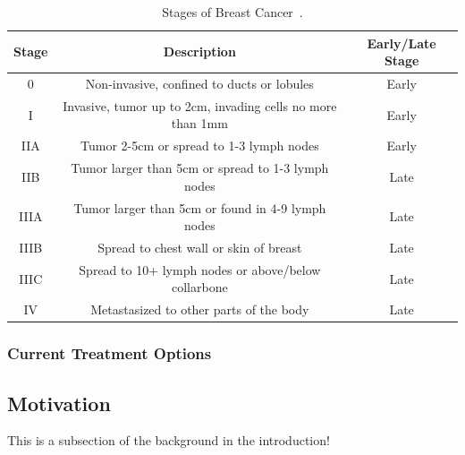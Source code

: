 \begin{table}[h!]
        \centering
        \begin{tabular}{|c|c|c|}
                \hline
                \textbf{Stage} & \textbf{Description}                                       & \textbf{Early/Late Stage} \\
                \hline
                0              & Non-invasive, confined to ducts or lobules                 & Early                     \\
                \hline
                I              & Invasive, tumor up to 2cm, invading cells no more than 1mm & Early                     \\
                \hline
                IIA            & Tumor 2-5cm or spread to 1-3 lymph nodes                   & Early                     \\
                \hline
                IIB            & Tumor larger than 5cm or spread to 1-3 lymph nodes         & Late                      \\
                \hline
                IIIA           & Tumor larger than 5cm or found in 4-9 lymph nodes          & Late                      \\
                \hline
                IIIB           & Spread to chest wall or skin of breast                     & Late                      \\
                \hline
                IIIC           & Spread to 10+ lymph nodes or above/below collarbone        & Late                      \\
                \hline
                IV             & Metastasized to other parts of the body                    & Late                      \\
                \hline
        \end{tabular}
        \caption{Stages of Breast Cancer~\cite{RefWorks:RefID:151-2025breast, RefWorks:RefID:365-stages}.}
        \label{tab:introduction:breastcancer:stages}
\end{table}

\subsubsection{Current Treatment Options\label{sec:introduction:breastcancer:currenttreatmentoptions}}

\subsection{Motivation\label{sec:introduction:motivation}}
This is a subsection of the background in the introduction!
